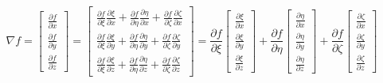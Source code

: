\documentclass
[
a4paper,                      %
twoside,					  %
12pt,                         %
abstract,		      %
fleqn,                        %
]
{scrartcl} %
\begin{document}
\begin{equation}
\nabla f=\begin{bmatrix}
\frac{\partial f}{\partial x}\\[5pt]
\frac{\partial f}{\partial y}\\[5pt]
\frac{\partial f}{\partial z}
\end{bmatrix}=\begin{bmatrix}
\frac{\partial f}{\partial\xi}\frac{\partial\xi}{\partial x}+\frac{\partial f}{\partial\eta}\frac{\partial\eta}{\partial x}+\frac{\partial f}{\partial\zeta}\frac{\partial\zeta}{\partial x}\\[5pt]
\frac{\partial f}{\partial\xi}\frac{\partial\xi}{\partial y}+\frac{\partial f}{\partial\eta}\frac{\partial\eta}{\partial y}+\frac{\partial f}{\partial\zeta}\frac{\partial\zeta}{\partial y}\\[5pt]
\frac{\partial f}{\partial\xi}\frac{\partial\xi}{\partial z}+\frac{\partial f}{\partial\eta}\frac{\partial\eta}{\partial z}+\frac{\partial f}{\partial\zeta}\frac{\partial\zeta}{\partial z}
\end{bmatrix}=\frac{\partial f}{\partial\xi}\begin{bmatrix}
\frac{\partial\xi}{\partial x}\\[5pt]
\frac{\partial\xi}{\partial y}\\[5pt]
\frac{\partial\xi}{\partial z}\end{bmatrix}+\frac{\partial f}{\partial\eta}\begin{bmatrix}
\frac{\partial\eta}{\partial x}\\[5pt]
\frac{\partial\eta}{\partial y}\\[5pt]
\frac{\partial\eta}{\partial z}\end{bmatrix}+\frac{\partial f}{\partial\zeta}\begin{bmatrix}
\frac{\partial\zeta}{\partial x}\\[5pt]
\frac{\partial\zeta}{\partial y}\\[5pt]
\frac{\partial\zeta}{\partial z}
\end{bmatrix}
\end{equation}
\end{document}
